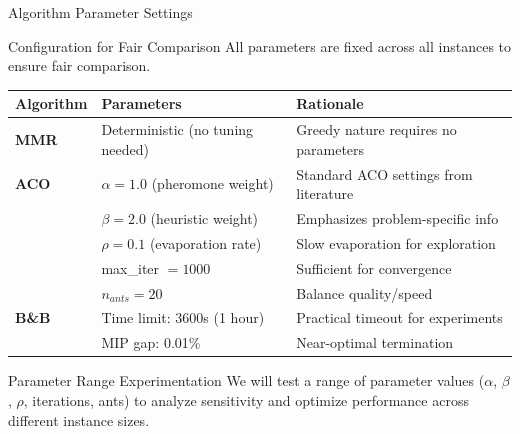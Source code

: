 \documentclass[aspectratio=43,8pt]{beamer}
\begin{document}
\begin{frame}{Algorithm Parameter Settings}
\begin{block}{Configuration for Fair Comparison}
All parameters are fixed across all instances to ensure fair comparison.
\end{block}

\vspace{0.3cm}
\begin{table}[h]
\centering
\begin{tabular}{lll}
\toprule
\textbf{Algorithm} & \textbf{Parameters} & \textbf{Rationale} \\
\midrule
\textbf{MMR} & Deterministic (no tuning needed) & Greedy nature requires no parameters \\
\addlinespace
\textbf{ACO} & $\alpha=1.0$ (pheromone weight) & Standard ACO settings from literature \\
             & $\beta=2.0$ (heuristic weight) & Emphasizes problem-specific info \\
             & $\rho=0.1$ (evaporation rate) & Slow evaporation for exploration \\
             & max\_iter $= 1000$ & Sufficient for convergence \\
             & $n_{ants} = 20$ & Balance quality/speed \\
\addlinespace
\textbf{B\&B} & Time limit: 3600s (1 hour) & Practical timeout for experiments \\
              & MIP gap: 0.01\% & Near-optimal termination \\
\bottomrule
\end{tabular}
\end{table}

\begin{alertblock}{Parameter Range Experimentation}
We will test a range of parameter values ($\alpha$, $\beta$, $\rho$, iterations, ants) to analyze sensitivity and optimize performance across different instance sizes.
\end{alertblock}
\end{frame}
\end{document}
